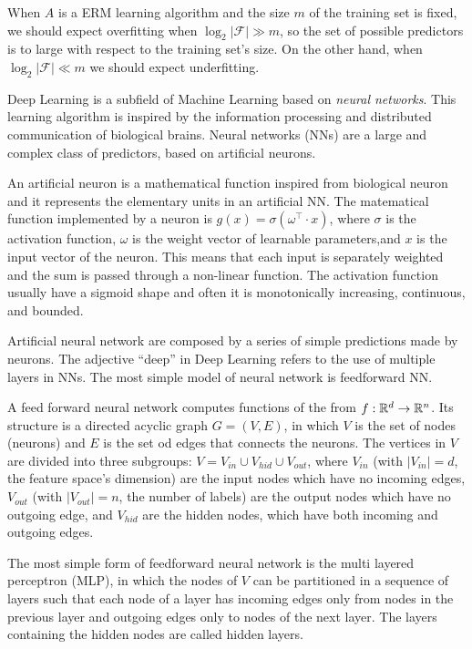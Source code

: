 When $A$ is a ERM learning algorithm and the size $m$ of the training set is fixed, we should expect overfitting when $\log_2|\mathcal{F}| \gg m$, so the set of possible predictors is to large with respect to the training set's size. On the other hand, when $\log_2|\mathcal{F}| \ll m$ we should expect underfitting.

Deep Learning is a subfield of Machine Learning based on \textit{neural networks}. This learning algorithm is inspired by the information processing and distributed communication of biological brains. Neural networks (NNs) are a large and complex class of predictors, based on artificial neurons.

\begin{definition}[Neuron]
	An artificial neuron is a mathematical function inspired from biological neuron and it represents the elementary units in an artificial NN. The matematical function implemented by a neuron is $g(x) = \sigma(\omega^\intercal \cdot x)$, where $\sigma$ is the activation function, $\omega$ is the weight vector of learnable parameters,and $x$ is the input vector of the neuron. This means that each input is separately weighted and the sum is passed through a non-linear function. The activation function usually have a sigmoid shape and often it is monotonically increasing, continuous, and bounded. 	
\end{definition}

Artificial neural network are composed by a series of simple predictions made by neurons. The adjective ``deep'' in Deep Learning refers to the use of multiple layers in NNs. The most simple model of neural network is feedforward NN. 

\begin{definition}
A feed forward neural network computes functions of the from $f : \mathbb{R}^d \to \mathbb{R}^n$. Its structure is a directed acyclic graph $G = (V, E)$, in which $V$ is the set of nodes (neurons) and $E$ is the set od edges that connects the neurons. The vertices in $V$ are divided into three subgroups: $V = V_{in} \cup V_{hid} \cup V_{out}$, where $V_{in}$ (with $|V_{in}| = d$, the feature space's dimension) are the input nodes which have no incoming edges, $V_{out}$ (with $|V_{out}| = n$, the number of labels) are the output nodes which have no outgoing edge, and $V_{hid}$ are the hidden nodes, which have both incoming and outgoing edges.
\end{definition}

The most simple form of feedforward neural network is the multi layered perceptron (MLP), in which the nodes of $V$ can be partitioned in a sequence of layers such that each node of a layer has incoming edges only from
nodes in the previous layer and outgoing edges only to nodes of the next layer.  The layers containing the hidden nodes are called hidden layers. 


